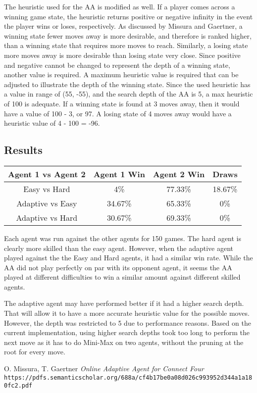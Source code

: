 \documentclass[12pt]{article}
\begin{document}
The heuristic used for the AA is modified as well. If a player comes across a winning game state, the heuristic returns positive or negative infinity in the event the player wins or loses, respectively. As discussed by Missura and Gaertner, a winning state fewer moves away is more desirable, and therefore is ranked higher, than a winning state that requires more moves to reach. Similarly, a losing state more moves away is more desirable than losing state very close. Since positive and negative cannot be changed to represent the depth of a winning state, another value is required. A maximum heuristic value is required that can be adjusted to illustrate the depth of the winning state. Since the used heuristic has a value in range of (55, -55), and the search depth of the AA is 5, a max heuristic of 100 is adequate. If a winning state is found at 3 moves away, then it would have a value of 100 - 3, or 97. A losing state of 4 moves away would have a heuristic value of 4 - 100 = -96.


\subsection*{Results}
\begin{center}
    \begin{tabular}{ | c | c | c | c | }
        \hline
        Agent 1 vs Agent 2 & Agent 1 Win & Agent 2 Win & Draws \\
        \hline
        Easy vs Hard & 4\% & 77.33\% & 18.67\% \\
        \hline
        Adaptive vs Easy & 34.67\% & 65.33\% & 0\% \\
        \hline
        Adaptive vs Hard & 30.67\% & 69.33\% & 0\% \\
        \hline
    \end{tabular}
\end{center}

Each agent was run against the other agents for 150 games. The hard agent is clearly more skilled than the easy agent. However, when the adaptive agent played against the the Easy and Hard agents, it had a similar win rate. While the AA did not play perfectly on par with its opponent agent, it seems the AA played at different difficulties to win a similar amount against different skilled agents.

The adaptive agent may have performed better if it had a higher search depth. That will allow it to have a more accurate heuristic value for the possible moves. However, the depth was restricted to 5 due to performance reasons. Based on the current implementation, using higher search depths took too long to perform the next move as it has to do Mini-Max on two agents, without the pruning at the root for every move.


\begin{thebibliography}{9}
    O. Missura, T. Gaertner
    \emph{Online Adaptive Agent for Connect Four}
    \texttt{https://pdfs.semanticscholar.org/688a/cf4b17be0a08d026c993952d344a1a180fc2.pdf}
\end{thebibliography}
\end{document}
